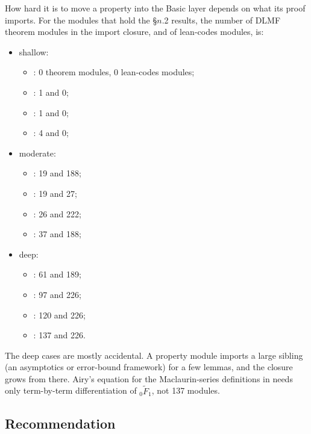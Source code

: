 \documentclass[11pt,a4paper]{article}
\begin{document}
How hard it is to move a property into the Basic layer depends on what its proof imports. For
the modules that hold the §\(n\).2 results, the number of DLMF theorem modules in the import
closure, and of lean-codes modules, is:
\begin{itemize}
  \item shallow:
    \begin{itemize}
      \item {}: 0 theorem modules, 0 lean-codes modules;
      \item {}: 1 and 0;
      \item {}: 1 and 0;
      \item {}: 4 and 0;
    \end{itemize}
  \item moderate:
    \begin{itemize}
      \item {}: 19 and 188;
      \item {}: 19 and 27;
      \item {}: 26 and 222;
      \item {}: 37 and 188;
    \end{itemize}
  \item deep:
    \begin{itemize}
      \item {}: 61 and 189;
      \item {}: 97 and 226;
      \item {}: 120 and 226;
      \item {}: 137 and 226.
    \end{itemize}
\end{itemize}
The deep cases are mostly accidental. A property module imports a large sibling (an asymptotics
or error-bound framework) for a few lemmas, and the closure grows from there. Airy's equation
for the Maclaurin-series definitions in  needs only term-by-term
differentiation of \({}_0\tilde F_1\), not 137 modules.

\subsection{Recommendation}
\end{document}

